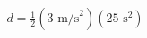 \documentclass[preview]{standalone}
\begin{document}
\begin{align*}
d = \frac{1}{2}(3 \text{ m/s}^2)(25 \text{ s}^2)
\end{align*}
\end{document}
